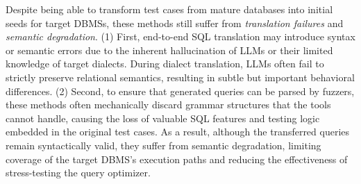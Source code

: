 \documentclass[sigconf,review,anonymous]{acmart}
\begin{document}

Despite being able to transform test cases from mature databases into initial seeds for target DBMSs, these methods still suffer from \textit{translation failures} and \textit{semantic degradation}.
(1) First, end-to-end SQL translation may introduce syntax or semantic errors due to the inherent hallucination of LLMs or their limited knowledge of target dialects. During dialect translation, LLMs often fail to strictly preserve relational semantics, resulting in subtle but important behavioral differences. 
(2) Second, to ensure that generated queries can be parsed by fuzzers, these methods often mechanically discard grammar structures that the tools cannot handle, causing the loss of valuable SQL features and testing logic embedded in the original test cases. As a result, although the transferred queries remain syntactically valid, they suffer from semantic degradation, limiting coverage of the target DBMS’s execution paths and reducing the effectiveness of stress-testing the query optimizer.

\end{document}
